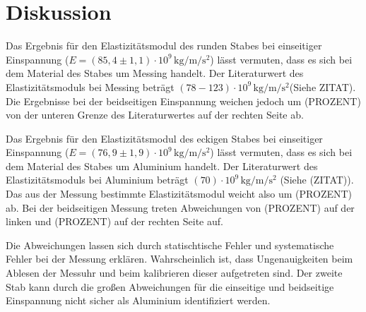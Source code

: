 \section{Diskussion}
\label{sec:Diskussion}


Das Ergebnis für den Elastizitätsmodul des runden
Stabes bei einseitiger Einspannung ($E=(85,4 \pm 1,1) \cdot 10^{9} \,\si{\kilo\gram\per\meter\per\second\squared}$)
lässt vermuten, dass es sich bei dem Material des
Stabes um Messing handelt. Der Literaturwert 
des Elastizitätsmoduls bei Messing beträgt
$(78-123)\cdot 10^{9} \,\si{\kilo\gram\per\meter\per\second\squared}$(Siehe ZITAT).
Die Ergebnisse bei der beidseitigen Einspannung weichen
jedoch um (PROZENT) von der unteren Grenze des Literaturwertes
auf der rechten Seite ab.


Das Ergebnis für den Elastizitätsmodul des eckigen
Stabes bei einseitiger Einspannung ($E=(76,9 \pm 1,9) \cdot 10^{9} \,\si{\kilo\gram\per\meter\per\second\squared}$)
lässt vermuten, dass es sich bei dem Material des
Stabes um Aluminium handelt. Der Literaturwert 
des Elastizitätsmoduls bei Aluminium beträgt
$(70)\cdot 10^{9} \,\si{\kilo\gram\per\meter\per\second\squared}$ (Siehe (ZITAT)).
Das aus der Messung bestimmte Elastizitätsmodul weicht also um (PROZENT) ab.
Bei der beidseitigen Messung treten Abweichungen von (PROZENT)
auf der linken und (PROZENT) auf der rechten Seite auf.


Die Abweichungen lassen sich durch statischtische Fehler
und systematische Fehler bei der Messung erklären. 
Wahrscheinlich ist, dass Ungenauigkeiten beim Ablesen der Messuhr
und beim kalibrieren dieser aufgetreten sind.
Der zweite Stab kann durch die großen Abweichungen
für die einseitige und beidseitige Einspannung nicht sicher
als Aluminium identifiziert werden.